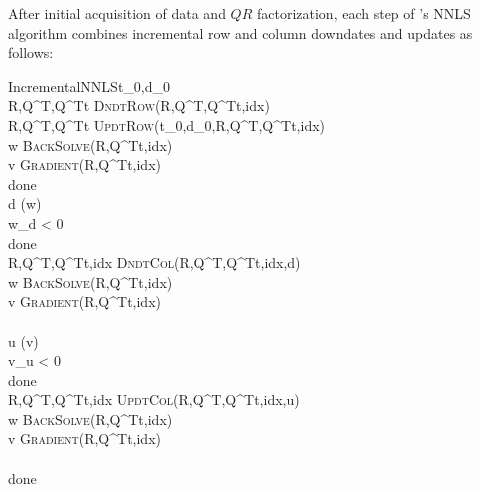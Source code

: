 After initial acquisition of data and $QR$ factorization, each step of \pacora's NNLS algorithm
combines incremental row and column downdates and updates as follows:

\begin{pseudocode}{IncrementalNNLS}{t_0,d_0}
                              \\
R,Q^T,Q^Tt \GETS \textsc{DndtRow}(R,Q^T,Q^Tt,idx)           \\
R,Q^T,Q^Tt \GETS \textsc{UpdtRow}(t_0,d_0,R,Q^T,Q^Tt,idx)     \\
w \GETS \textsc{BackSolve}(R,Q^Tt,idx)                          \\
v \GETS \textsc{Gradient}(R,Q^Tt,idx)                    \\
\REPEAT
  done \GETS \TRUE                                              \\  
  d \GETS \arg\min(w)                                          \\
  \IF w_d < 0 \THEN                                            \\
  \BEGIN
    done \GETS \FALSE                                         \\
    R,Q^T,Q^Tt,idx \GETS \textsc{DndtCol}(R,Q^T,Q^Tt,idx,d)   \\
    w \GETS \textsc{BackSolve}(R,Q^Tt,idx)                    \\
    v \GETS \textsc{Gradient}(R,Q^Tt,idx)              \\
  \END                                                        \\
  u \GETS \arg\min(v)                                         \\
  \IF v_u < 0 \THEN                                           \\
  \BEGIN
    done \GETS \FALSE                                         \\
    R,Q^T,Q^Tt,idx \GETS \textsc{UpdtCol}(R,Q^T,Q^Tt,idx,u)     \\
    w \GETS \textsc{BackSolve}(R,Q^Tt,idx)                    \\
    v \GETS \textsc{Gradient}(R,Q^Tt,idx)              \\
  \END                                                        \\
\UNTIL done                                                   \\ 
                                                  \\     
\end{pseudocode}
 
